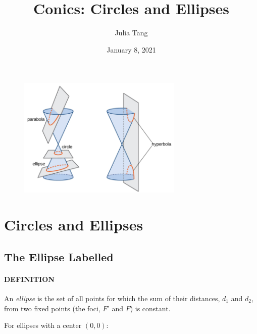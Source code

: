 \documentclass{article}
\title{\textbf{Conics: Circles and Ellipses}}
\author{Julia Tang}
\date{January 8, 2021}
\begin{document}


\maketitle
\begin{figure}[H]
  \begin{center}
    \includegraphics[width=0.7\textwidth]{conics.png}
  \end{center}
\end{figure}
\newpage

\doublespacing
\tableofcontents
\singlespacing

\newpage
\section{Circles and Ellipses}

\subsection{The Ellipse Labelled}

\paragraph{\textbf{DEFINITION}}
An \textit{\colorbox{yellowOrange}{ellipse}} is the set of all points for which the sum of their distances, \textcolor{blueGreen2}{$d_1$} and \textcolor{blueGreen1}{$d_2$}, from two fixed points (the foci, \textcolor{redOrange}{$F\prime$} and \textcolor{redOrange}{$F$}) is constant.

For ellipses with a center $(0,0)$:
\end{document}
